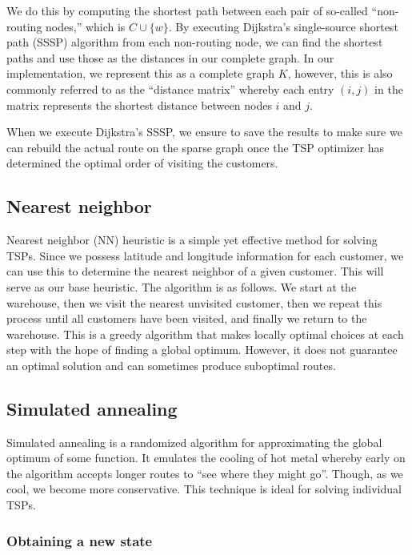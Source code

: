 \documentclass[conference]{IEEEtran}
\begin{document}
We do this by computing the shortest path between each pair of so-called ``non-routing nodes,'' which is $C\cup\{w\}$. By executing Dijkstra's single-source shortest path (SSSP) algorithm from each non-routing node, we can find the shortest paths and use those as the distances in our complete graph. In our implementation, we represent this as a complete graph $K$, however, this is also commonly referred to as the ``distance matrix'' whereby each entry $(i,j)$ in the matrix represents the shortest distance between nodes $i$ and $j$.

When we execute Dijkstra's SSSP, we ensure to save the results to make sure we can rebuild the actual route on the sparse graph once the TSP optimizer has determined the optimal order of visiting the customers.

\subsection{Nearest neighbor}

Nearest neighbor (NN) heuristic is a simple yet effective method for solving TSPs. Since we possess latitude and longitude information for each customer, we can use this to determine the nearest neighbor of a given customer. This will serve as our base heuristic. The algorithm is as follows. We start at the warehouse, then we visit the nearest unvisited customer, then we repeat this process until all customers have been visited, and finally we return to the warehouse. This is a greedy algorithm that makes locally optimal choices at each step with the hope of finding a global optimum. However, it does not guarantee an optimal solution and can sometimes produce suboptimal routes.

\subsection{Simulated annealing}

Simulated annealing is a randomized algorithm for approximating the global optimum of some function. It emulates the cooling of hot metal whereby early on the algorithm accepts longer routes to ``see where they might go''. Though, as we cool, we become more conservative. This technique is ideal for solving individual TSPs.

\subsubsection{Obtaining a new state}
\end{document}
